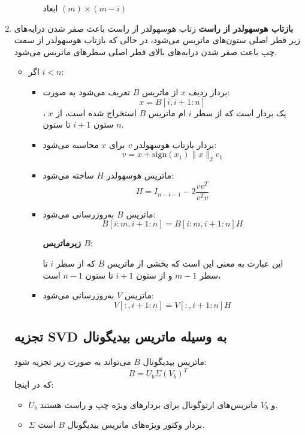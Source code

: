 \begin{enumerate}
\begin{itemize}
\begin{itemize}
           ابعاد  \( (m) \times (m-i) \)   
    \end{itemize}

  \end{itemize}

  \item \textbf{بازتاب هوسهولدر از راست}
  زتاب هوسهولدر از راست باعث صفر شدن درایه‌های زیر قطر اصلی ستون‌های ماتریس می‌شود، در حالی که بازتاب هوسهولدر از سمت چپ باعث صفر شدن درایه‌های بالای قطر اصلی سطرهای ماتریس می‌شود.
  \begin{itemize}
    \item اگر \( i < n  \):
    \begin{itemize}
      \item بردار ردیف \( x \) از ماتریس \( B \) تعریف می‌شود به صورت:
      \[
      x = B[i, i+1:n]
      \]
      ، \( x \) یک بردار است که از سطر \( i \) ام ماتریس \( B \) استخراج شده است، از ستون \( i+1 \) تا ستون \( n \).


      \item بردار بازتاب هوسهولدر \( v \) برای \( x \) محاسبه می‌شود:
      \[
      v = x + \text{sign}(x_1) \|x\|_2 e_1
      \]
      \item ماتریس هوسهولدر \( H \) ساخته می‌شود:
      \[
      H = I_{n-i-1} - 2 \frac{vv^T}{v^T v}
      \]
      \item ماتریس \( B \) به‌روزرسانی می‌شود:
      \[
      B[i:m, i+1:n] = B[i:m, i+1:n] H
      \]

     \textbf{زیرماتریس \( B \)}:

       این عبارت به معنی این است که بخشی از ماتریس \( B \) که از سطر \( i \) تا سطر \( m-1 \) و از ستون \( i+1 \) تا ستون \( n-1 \) است، 
      \item ماتریس \( V \) به‌روزرسانی می‌شود:
      \[
      V[:, i+1:n] = V[:, i+1:n] H
      \]
      \pagebreak
    \end{itemize}
  \end{itemize}



\subsection{تجزیه SVD  به وسیله ماتریس بیدیگونال }

ماتریس بیدیگونال \( B \) می‌تواند به صورت زیر تجزیه شود:
\[
B = U_b \Sigma (V_b)^T
\]
که در اینجا:
\begin{itemize}
    \item \( U_b \) و \( V_b \) ماتریس‌های ارتوگونال برای بردارهای ویژه چپ و راست هستند.
    \item \( \Sigma \) بردار وکتور ویژه‌های ماتریس بیدیگونال \( B \) است.
\end{itemize}


\end{enumerate}
